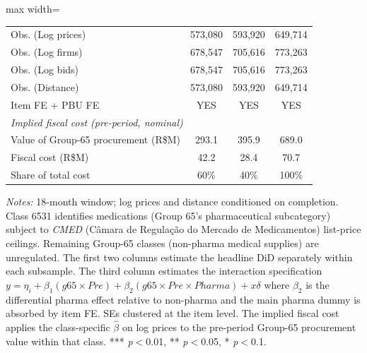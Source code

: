 \begin{table}[htbp]
\begin{adjustbox}{max width=\textwidth}
\begin{threeparttable}
\begin{tabular}{lccc}
\addlinespace
\midrule
Obs. (Log prices) & 573,080 & 593,920 & 649,714 \\
Obs. (Log firms)  & 678,547 & 705,616 & 773,263 \\
Obs. (Log bids)   & 678,547 & 705,616 & 773,263 \\
Obs. (Distance)   & 573,080 & 593,920 & 649,714 \\
Item FE + PBU FE & YES & YES & YES \\
\midrule
\multicolumn{4}{l}{\textit{Implied fiscal cost (pre-period, nominal)}} \\
Value of Group-65 procurement (R\$M) & 293.1 & 395.9 & 689.0 \\
Fiscal cost (R\$M) & 42.2 & 28.4 & 70.7 \\
Share of total cost & 60\% & 40\% & 100\% \\
\bottomrule
\end{tabular}
\begin{tablenotes}
\small
\item \textit{Notes:} 18-month window; log prices and distance conditioned on completion.
Class 6531 identifies medications (Group 65's pharmaceutical subcategory)
subject to \emph{CMED} (C\^amara de Regula\c{c}\~ao do Mercado de Medicamentos)
list-price ceilings. Remaining Group-65 classes (non-pharma medical supplies) are
unregulated. The first two columns estimate the headline DiD separately within
each subsample. The third column estimates the interaction specification
$y = \eta_i + \beta_1 (g65 \times Pre) + \beta_2 (g65 \times Pre \times Pharma) + x\delta$
where $\beta_2$ is the differential pharma effect relative to non-pharma and the main
pharma dummy is absorbed by item FE. SEs clustered at the item level.
The implied fiscal cost applies the class-specific $\hat\beta$ on log prices to the
pre-period Group-65 procurement value within that class.
*** \textit{p}$<$0.01, ** \textit{p}$<$0.05, * \textit{p}$<$0.1.
\end{tablenotes}
\end{threeparttable}
\end{adjustbox}
\end{table}
